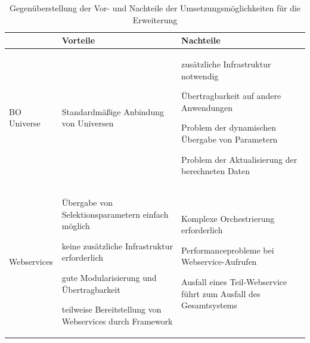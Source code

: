 \begin{onehalfspacing}
{
\setlength{\extrarowheight}{2pt}
\begin{table}[h]
\centering
\begin{tabular}{| l | >{\centering\arraybackslash} m{5cm} | >{\centering\arraybackslash} m{5cm} |}
\cline{2-3}
\multicolumn{1}{l|}{}	& Vorteile & Nachteile \\	\hline
BO Universe 				&


\begin{seList}
\item Standardmäßige Anbindung von Universen
\end{seList}

&


\begin{seList}
\item zusätzliche Infrastruktur notwendig
\item Übertragbarkeit auf andere Anwendungen
\item Problem der dynamischen Übergabe von Parametern
\item Problem der Aktualisierung der berechneten Daten
\end{seList}


\\	\hline
Webservices 			& 

\begin{seList}
\item Übergabe von Selektionsparametern einfach möglich
\item keine zusätzliche Infrastruktur erforderlich
\item gute Modularisierung und Übertragbarkeit
\item teilweise Bereitstellung von Webservices durch Framework
\end{seList}

& 


\begin{seList}
\item Komplexe Orchestrierung erforderlich
\item Performanceprobleme bei Webservice-Aufrufen
\item Ausfall eines Teil-Webservice führt zum Ausfall des Gesamtsystems
\end{seList}

\\	\hline
\end{tabular} 
\caption{Gegenüberstellung der Vor- und Nachteile der Umsetzungsmöglichkeiten für die Erweiterung \label{table:vergleich_umsetzung}}
\end{table}
}


\end{onehalfspacing}
